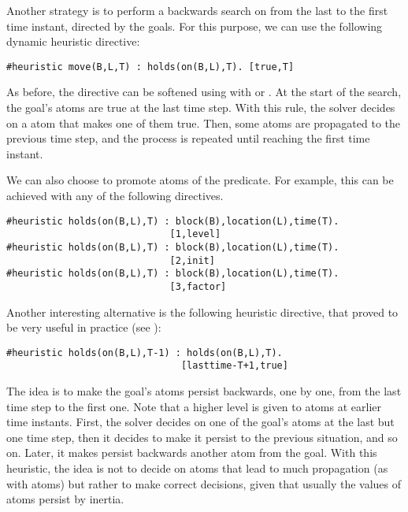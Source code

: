 Another strategy is to perform a backwards search on  from the last to the
first time instant, directed by the goals. 
For this purpose, we can use the following dynamic heuristic directive: 
\begin{lstlisting}[basicstyle=\small\ttfamily,numbers=none]
#heuristic move(B,L,T) : holds(on(B,L),T). [true,T]
\end{lstlisting}
As before, the directive can be softened using  with  or .
At the start of the search, the goal's  atoms are true at the last time step.
With this rule, the solver decides on a  atom that makes one of them true.
Then, some  atoms are propagated to the previous time step,
and the process is repeated until reaching the first time instant.

We can also choose to promote atoms of the  predicate.  
For example, this can be achieved with any of the following directives.
\begin{lstlisting}[basicstyle=\small\ttfamily,numbers=none]
#heuristic holds(on(B,L),T) : block(B),location(L),time(T).
                             [1,level]
#heuristic holds(on(B,L),T) : block(B),location(L),time(T).
                             [2,init]
#heuristic holds(on(B,L),T) : block(B),location(L),time(T).
                             [3,factor]
\end{lstlisting}

Another interesting alternative is the following heuristic directive,  
that proved to be very useful in practice (see \cite{gekaotroscwa13a}):
\begin{lstlisting}[basicstyle=\small\ttfamily,numbers=none]
#heuristic holds(on(B,L),T-1) : holds(on(B,L),T). 
                               [lasttime-T+1,true] 
\end{lstlisting}
The idea is to make the goal's  atoms persist backwards, 
one by one, from the last time step to the first one.
Note that a higher level is given to atoms at earlier time instants.
First, the solver decides on one of the goal's  atoms at the last but one time step,
then it decides to make it persist to the previous situation, and so on.
Later, it makes persist backwards another  atom from the goal.
With this heuristic,
the idea is not to decide on atoms that lead to much propagation (as with  atoms)
but rather to make correct decisions, 
given that usually the values of  atoms persist by inertia.



